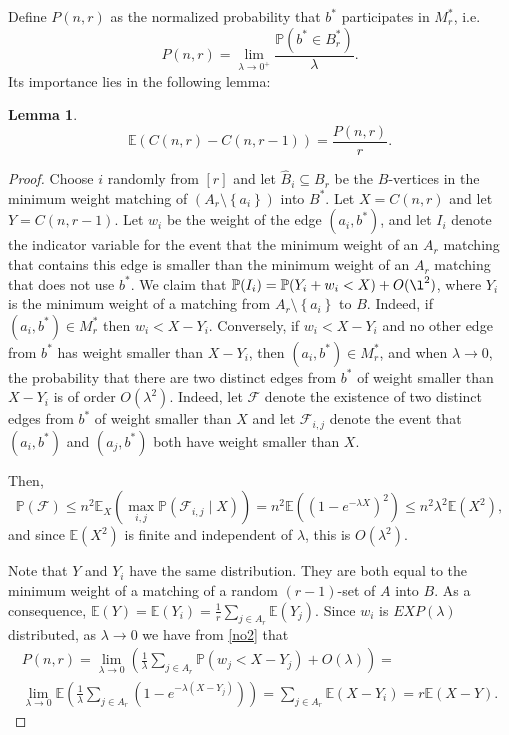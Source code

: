 \documentclass[12pt]{article}
\newcommand{\1}{\textbf{1}}
\newtheorem{lemma}[theorem]{Lemma}
\newcommand{\brac}[1]{\left(#1\right)}
\newcommand{\set}[1]{\left\{#1\right\}}
\def\E{\mathbb{E}}
\def\Pr{\mathbb{P}}
\newcommand{\beq}[2]{\begin{equation}\label{#1}#2\end{equation}}
\newcommand{\mults}[1]{\begin{multline*}#1\end{multline*}}
\begin{document}
Define $P(n, r)$ as the normalized probability that $b^*$ participates in $M_r^*$, i.e.
\begin{equation}
 P(n, r) = \lim_{\lambda \rightarrow 0^+} \frac{\Pr(b^*\in B_r^*)}{\lambda}.
\end{equation}
Its importance lies in the following lemma:
\begin{lemma}\label{lem10a}
\begin{equation}
\E(C(n, r) - C(n, r-1)) = \frac{P(n, r)}{r}.
\end{equation}
\end{lemma}
\begin{proof}
Choose $i$ randomly from $[r]$ and let $\widehat{B}_i\subseteq B_r$ be the $B$-vertices in the minimum weight matching of $(A_r\setminus\set{a_i})$ into $B^*$. Let $X=C(n,r)$ and let $Y=C(n,r-1)$. Let $w_i$ be the weight of the edge $(a_i, b^*)$, and let $I_i$ denote the indicator variable for the event that the minimum weight of an  $A_{r}$ matching that contains this edge is smaller than the minimum weight of an $A_{r}$ matching that does not use $b^*$. We claim that $\Pr(I_i)= \Pr(Y_i + w_i < X) + O(\l^2)$, where $Y_i$ is the minimum weight of a matching from $A_r\setminus \set{a_i}$ to $B$. 
Indeed, if $(a_i, b^*) \in M_r^*$ then $w_i < X - Y_i$. Conversely, if $w_i < X - Y_i$ and no other edge from $b^*$ has weight smaller than $X - Y_i$, then $(a_i, b^*)\in M_r^*$, and when $\lambda \to 0$, the probability that there are two distinct edges from $b^*$ of weight smaller than $X - Y_i$ is of order $O(\lambda^2)$. Indeed, let ${\mathcal F}$ denote the existence of two distinct edges from $b^*$ of weight smaller than $X$ and let ${\mathcal F}_{i,j}$ denote the event that $(a_i,b^*)$ and $(a_j,b^*)$ both have weight smaller than $X$. 

Then, 
\beq{no2}{
\Pr({\mathcal F})\leq n^2\E_X(\max_{i,j}\Pr({\mathcal F}_{i,j}\mid X))=n^2\E((1-e^{-\lambda X})^2)\leq n^2\lambda^2\E(X^2),
}
and since $\E(X^2)$ is finite and independent of $\lambda$, this is $O(\lambda^2)$.

Note that $Y$ and $Y_i$ have the same distribution. They are both equal to the minimum weight of a matching of a random $(r-1)$-set of $A$ into $B$. As a consequence, $\E(Y)=\E(Y_i)=\frac{1}{r}\sum_{j\in A_r}\E(Y_j)$. Since $w_i$ is $EXP(\lambda)$ distributed, as $\lambda\to 0$ we have from \eqref{no2} that 
\mults{
P(n,r)= \lim_{\lambda \rightarrow 0} \brac{\frac{1}{\lambda}\sum_{j\in A_r}\Pr(w_j<X-Y_j)+O(\lambda)}=\\
\lim_{\lambda \rightarrow 0}\E\brac{ \frac{1}{\lambda}\sum_{j\in A_r} \brac{1- e^{-\lambda(X-Y_j)}}}
=\sum_{j\in A_r}\E(X - Y_i) = r\E(X - Y).
}
\end{proof}
\end{document}
